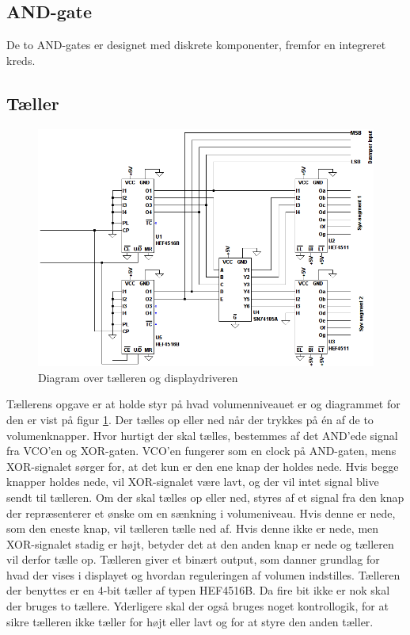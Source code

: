 \subsection*{AND-gate}
\label{volumenkontrol-design-and}

De to AND-gates er designet med diskrete komponenter, fremfor en integreret kreds.

\subsection*{Tæller}
\label{volumenkontrol-design-taeller}

\begin{figure}[h]
\centering
\includegraphics[width=\textwidth]{teknisk/volumenkontrol/taeller.png}
\caption{Diagram over tælleren og displaydriveren}
\label{fig:taeller}
\end{figure}
Tællerens opgave er at holde styr på hvad volumenniveauet er og diagrammet for den er vist på figur \ref{fig:taeller}. Der tælles op eller ned når der trykkes på én af de to volumenknapper. Hvor hurtigt der skal tælles, bestemmes af det AND'ede signal fra VCO'en og XOR-gaten. VCO'en fungerer som en clock på AND-gaten, mens XOR-signalet sørger for, at det kun er den ene knap der holdes nede. Hvis begge knapper holdes nede, vil XOR-signalet være lavt, og der vil intet signal blive sendt til tælleren. Om der skal tælles op eller ned, styres af et signal fra den knap der repræsenterer et ønske om en sænkning i volumeniveau. Hvis denne er nede, som den eneste knap, vil tælleren tælle ned af. Hvis denne ikke er nede, men XOR-signalet stadig er højt, betyder det at den anden knap er nede og tælleren vil derfor tælle op. Tælleren giver et binært output, som danner grundlag for hvad der vises i displayet og hvordan reguleringen af volumen indstilles. Tælleren der benyttes er en 4-bit tæller af typen HEF4516B. Da fire bit ikke er nok skal der bruges to tællere. Yderligere skal der også bruges noget kontrollogik, for at sikre tælleren ikke tæller for højt eller lavt og for at styre den anden tæller.

